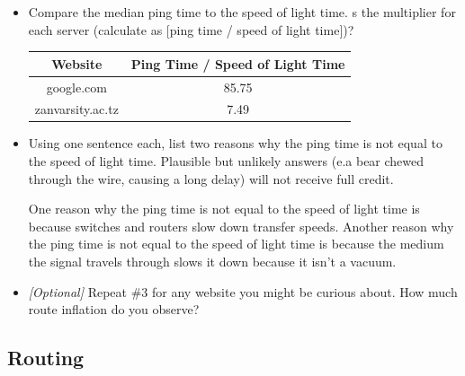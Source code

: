 \documentclass[10pt]{article}
\begin{document}
\begin{enumerate}
\begin{itemize}

\item Compare the median ping time to the speed of light time. s the multiplier for each server (calculate as [ping time / speed of light time])?

\begin{center}
\begin{tabular}{ || c | c || }
\hline
Website & Ping Time / Speed of Light Time \\
\hline \hline
google.com & 85.75 \\
\hline
zanvarsity.ac.tz & 7.49 \\
\hline
\end{tabular}
\end{center}

\item Using one sentence each, list two reasons why the ping time is not equal to the speed of light time. Plausible but unlikely answers (e.a bear chewed through the wire, causing a long delay) will not receive full credit.

One reason why the ping time is not equal to the speed of light time is because switches and routers slow down transfer speeds. Another reason why the ping time is not equal to the speed of light time is because the medium the signal travels through slows it down because it isn't a vacuum.

\item \emph{[Optional]} Repeat \#3 for any website you might be curious about. How much route inflation do you observe? 

\end{itemize}
\end{enumerate}

\newpage
\subsection*{Routing}
\end{document}
